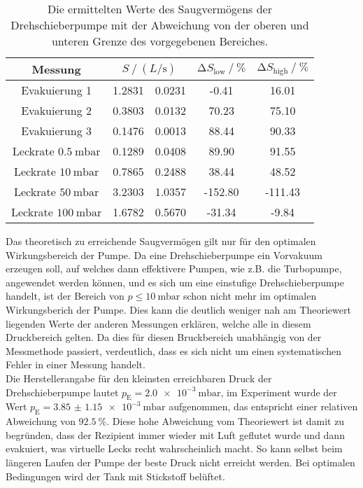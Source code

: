 \begin{table}
    \centering
    \caption{Die ermittelten Werte des Saugvermögens der Drehschieberpumpe mit der Abweichung von der oberen und unteren Grenze des vorgegebenen Bereiches.}
    \label{tab:compare_dreh}
    \begin{tabular}{c | S @{${}\pm{}$} S  S[table-format=4.2] S[table-format=4.2]}
        \toprule
        {Messung} &  & {$\increment S_\text{low} \mathbin{/} \si{\percent}$} & {$\increment S_\text{high} \mathbin{/} \si{\percent}$} \\ 
        \midrule
        Evakuierung 1                   & 1.2831 & 0.0231 & -0.41 &  16.01 \\
        Evakuierung 2                   & 0.3803 & 0.0132 & 70.23 &  75.10 \\
        Evakuierung 3                   & 0.1476 & 0.0013 & 88.44 &  90.33 \\
        Leckrate $\SI{0.5}{\milli\bar}$ & 0.1289 & 0.0408 & 89.90 &  91.55 \\
        Leckrate $\SI{10}{\milli\bar}$  & 0.7865 & 0.2488 & 38.44 &  48.52 \\
        Leckrate $\SI{50}{\milli\bar}$  & 3.2303 & 1.0357 &-152.80&-111.43 \\
        Leckrate $\SI{100}{\milli\bar}$ & 1.6782 & 0.5670 &-31.34 &  -9.84 \\
        \bottomrule
    \end{tabular}
\end{table}

\noindent Das theoretisch zu erreichende Saugvermögen gilt nur für den optimalen Wirkungsbereich der Pumpe. Da eine Drehschieberpumpe ein Vorvakuum erzeugen soll, auf welches dann effektivere Pumpen, 
wie z.B. die Turbopumpe, angewendet werden können, und es sich um eine einstufige Drehschieberpumpe handelt, ist der Bereich von $p \leq \SI{10}{\milli\bar}$ schon nicht mehr im optimalen 
Wirkungsberich der Pumpe. Dies kann die deutlich weniger nah am Theoriewert liegenden Werte der anderen Messungen erklären, welche alle in diesem Druckbereich gelten. 
Da dies für diesen Bruckbereich unabhängig von der Messmethode passiert, verdeutlich, dass es sich nicht um einen systematischen Fehler in einer Messung handelt. \\ 
Die Herstellerangabe für den kleinsten erreichbaren Druck der Drehschieberpumpe lautet $p_\text{E} = \SI{2.0e-3}{\milli\bar}$, im Experiment wurde der Wert 
$p_\text{E} = \SI{3.85(115)e-3}{\milli\bar}$ aufgenommen, das entspricht einer relativen Abweichung von $\SI{92.5}{\percent}$. Diese hohe Abweichung vom Theoriewert ist damit zu begründen, 
dass der Rezipient immer wieder mit Luft geflutet wurde und dann evakuiert, was virtuelle Lecks recht wahrscheinlich macht. So kann selbst beim längeren Laufen der Pumpe der beste Druck 
nicht erreicht werden. Bei optimalen Bedingungen wird der Tank mit Stickstoff belüftet. 


